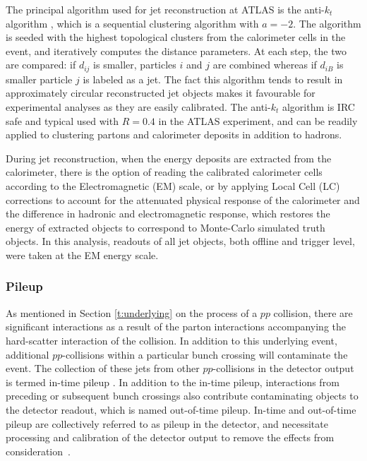 	The principal algorithm used for jet reconstruction at ATLAS is the anti-$k_t$ algorithm \cite{antikt}, which is a sequential clustering algorithm with $a=-2$. The algorithm is seeded with the highest \pt topological clusters from the calorimeter cells in the event, and iteratively computes the distance parameters. At each step, the two are compared: if $d_{ij}$ is smaller, particles $i$ and $j$ are combined whereas if $d_{iB}$ is smaller particle $j$ is labeled as a jet. The fact this algorithm tends to result in approximately circular reconstructed jet objects makes it favourable for experimental analyses as they are easily calibrated. The anti-$k_t$ algorithm is IRC safe and typical used with $R=0.4$ in the ATLAS experiment, and can be readily applied to clustering partons and calorimeter deposits in addition to hadrons.

	During jet reconstruction, when the energy deposits are extracted from the calorimeter, there is the option of reading the calibrated \cite{tilecalib} calorimeter cells according to the Electromagnetic (EM) scale, or by applying Local Cell (LC) corrections \cite{localcell} to account for the attenuated physical response of the calorimeter and the difference in hadronic and electromagnetic response, which restores the energy of extracted objects to correspond to Monte-Carlo simulated truth objects. In this analysis, readouts of all jet objects, both offline and trigger level, were taken at the EM energy scale.

	\subsubsection{Pileup}

	As mentioned in Section \ref{t:underlying} on the process of a $pp$ collision, there are significant interactions as a result of the parton interactions accompanying the hard-scatter interaction of the collision. In addition to this underlying event, additional $pp$-collisions within a particular bunch crossing will contaminate the event. The collection of these jets from other $pp$-collisions in the detector output is termed in-time pileup \cite{simpileup}. In addition to the in-time pileup, interactions from preceding or subsequent bunch crossings also contribute contaminating objects to the detector readout, which is named out-of-time pileup. In-time and out-of-time pileup are collectively referred to as pileup in the detector, and necessitate processing and calibration of the detector output to remove the effects from consideration~\cite{pileup}.


